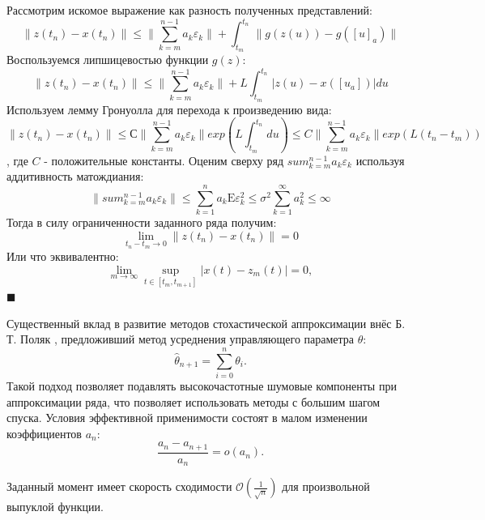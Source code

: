 Рассмотрим искомое выражение как разность полученных представлений:
\begin{equation}
    \| z(t_n) - x(t_n) \| \le \|\sum_{k=m}^{n-1} a_k \varepsilon_k \|+ \int_{t_m}^{t_n} \|g(z(u)) - g([u]_a)\|
\end{equation}
Воспользуемся липшицевостью функции $g(z)$:
\begin{equation}
    \| z(t_n) - x(t_n) \| \le  \|\sum_{k=m}^{n-1} a_k \varepsilon_k \| + L \int_{t_m}^{t_n} |z(u) - x([u_a])|du 
\end{equation}
Используем лемму Гронуолла для перехода к произведению вида:
\begin{equation}
    \| z(t_n) - x(t_n) \| \le  С \|\sum_{k=m}^{n-1} a_k \varepsilon_k \| exp(L \int_{t_m}^{t_n} du) \le C \|\sum_{k=m}^{n-1} a_k \varepsilon_k \| exp(L (t_n -t_m))
\end{equation}
, где $C$ - положительные константы.
Оценим сверху ряд $sum_{k=m}^{n-1} a_k \varepsilon_k$ используя аддитивность матождиания:
\begin{equation}
    \| sum_{k=m}^{n-1} a_k \varepsilon_k \| \le \sum_{k=1}^n a_k \mathrm{E} \varepsilon_k^2 \le \sigma^2 \sum^\infty_{k=1} a_k^2 \le \infty  
\end{equation}
Тогда в силу ограниченности заданного ряда получим:
\begin{equation}
    \lim_{t_n - t_m \rightarrow 0} \| z(t_n) - x(t_n) \|  = 0 
\end{equation}
Или что эквивалентно:
\begin{equation}
    \lim_{m \rightarrow \infty} \sup_{t \in [t_m, t_{m+1} ] } |x(t) - z_m(t)|=0, 
\end{equation}
$\blacksquare$

Существенный вклад в развитие методов стохастической аппроксимации внёс Б. Т. Поляк \cite{polyak1990new},
предложивший метод усреднения управляющего параметра $\theta$:
 \begin{equation}
     \hat{\theta}_{n+1} = \sum_{i=0}^n \theta_i.
     \label{polyak}
 \end{equation}
Такой подход позволяет подавлять высокочастотные шумовые компоненты при аппроксимации ряда, что позволяет использовать 
методы с большим шагом спуска. Условия эффективной применимости состоят в малом изменении коэффициентов $a_n$:
 \begin{equation}
    \frac{a_{n}-a_{n+1}}{a_{n}}=\mathit{o}(a_{n}).
    \label{polyak_assumptions}
 \end{equation}

Заданный момент имеет скорость сходимости $\mathcal{O}(\frac{1}{\sqrt{n}})$ для произвольной выпуклой функции. 

